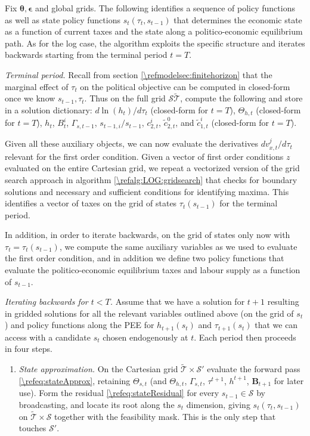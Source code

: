 \documentclass[a4paper]{article}
\begin{document}
\begin{alg}
\label{\refalg:CRRA:grid}
Fix $\bm{\theta},\bm{\epsilon}$ and global grids. The following identifies a sequence of policy functions as well as state policy functions $s_t(\tau_t, s_{t-1})$ that determines the economic state as a function of current taxes and the state along a politico-economic equilibrium path. As for the log case, the algorithm exploits the specific structure and iterates backwards starting from the terminal period $t=T$.


\smallskip\noindent\emph{Terminal period.}
Recall from section \ref{\refmodelsec:finitehorizon} that the marginal effect of $\tau_t$ on the political objective can be computed in closed-form once we know $s_{t-1}, \tau_t$. Thus on the full grid $\mathcal{S}\tilde{\mathcal{T}}$, compute the following and store in a solution dictionary: $d \ln(h_t)/d \tau_t$ (closed-form for $t=T$), $\Theta_{h,t}$ (closed-form for $t=T$), $h_t$, $B_t^i$, $\Gamma_{s,t-1}$, $s_{t-1,i}/s_{t-1}$, $c_{2,t}^i$, $\tilde{c}_{2,t}^0$, and $\tilde{c}_{1,t}^i$ (closed-form for $t=T$).

Given all these auxiliary objects, we can now evaluate the derivatives $dv_{x,t}^j/d\tau_t$ relevant for the first order condition. Given a vector of first order conditions $z$ evaluated on the entire Cartesian grid, we repeat a vectorized version of the grid search approach in algorithm \ref{\refalg:LOG:gridsearch} that checks for boundary solutions and necessary and sufficient conditions for identifying maxima. This identifies a vector of taxes on the grid of states $\tau_t(s_{t-1})$ for the terminal period.

In addition, in order to iterate backwards, on the grid of states only now with $\tau_t = \tau_t(s_{t-1})$, we compute the same auxiliary variables as we used to evaluate the first order condition, and in addition we define two policy functions that evaluate the politico-economic equilibrium taxes and labour supply as a function of $s_{t-1}$.

\smallskip\noindent\emph{Iterating backwards for $t<T$.} Assume that we have a solution for $t+1$ resulting in gridded solutions for all the relevant variables outlined above (on the grid of $s_t$) and policy functions along the PEE for $h_{t+1}(s_t)$ and $\tau_{t+1}(s_t)$ that we can access with a candidate $s_t$ chosen endogenously at $t$. Each period then proceeds in four steps.

\begin{enumerate}
    \item \emph{State approximation.} On the Cartesian grid $\tilde{\mathcal{T}}\times\mathcal{S}'$ evaluate the forward pass \eqref{\refeq:stateApprox}, retaining $\Theta_{s,t}$ (and $\Theta_{h,t}$, $\Gamma_{s,t}$, $\tau^{t+1}$, $h^{t+1}$, $\bm{B}_{t+1}$ for later use). Form the residual \eqref{\refeq:stateResidual} for every $s_{t-1}\in\mathcal{S}$ by broadcasting, and locate its root along the $s_t$ dimension, giving $s_t(\tau_t, s_{t-1})$ on $\tilde{\mathcal{T}}\times\mathcal{S}$ together with the feasibility mask. This is the only step that touches $\mathcal{S}'$.


\end{enumerate}
\end{alg}
\end{document}
